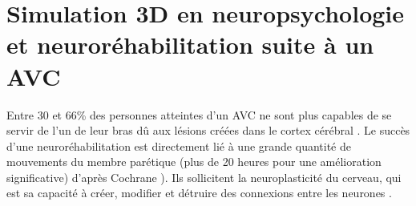 		\begin{minipage}{\linewidth}
			\label{Katz_CrossRoad}
		\end{minipage}\medskip
		

\section{Simulation 3D en neuropsychologie et neuroréhabilitation suite à un AVC}	
	\label{sSoaSim3DNeuropsyNeuroRehabAVC}
	Entre 30 et 66\% des personnes atteintes d'un AVC ne sont plus capables de se servir de l'un de leur bras dû aux lésions créées dans le cortex cérébral \cite{VanderLee_ForcedUse}. Le succès d'une neuroréhabilitation est directement lié à une grande quantité de mouvements du membre parétique (plus de 20 heures pour une amélioration significative) d'après Cochrane \cite{Cochrane_Intervention4MotorApraxia}). Ils sollicitent la neuroplasticité du cerveau, qui est sa capacité à créer, modifier et détruire des connexions entre les neurones \cite{Grefkes_CorticalReorganization}.

